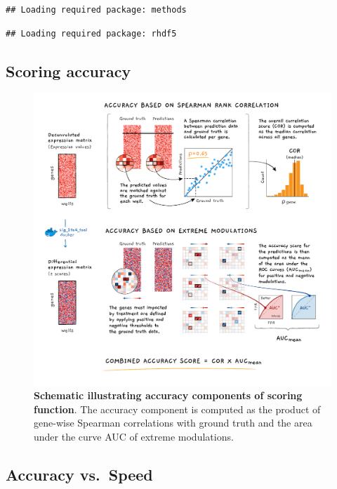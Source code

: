 \documentclass[]{article}
\begin{document}
\begin{verbatim}
## Loading required package: methods
\end{verbatim}

\begin{verbatim}
## Loading required package: rhdf5
\end{verbatim}

\hypertarget{scoring-accuracy}{%
\subsection{Scoring accuracy}\label{scoring-accuracy}}

\begin{figure}
\centering
\includegraphics{figures/deconvolution_contest Fig2_Final_revised.png}
\caption{\textbf{Schematic illustrating accuracy components of scoring
function}. The accuracy component is computed as the product of
gene-wise Spearman correlations with ground truth and the area under the
curve AUC of extreme modulations.}
\end{figure}

\hypertarget{accuracy-vs.-speed}{%
\subsection{Accuracy vs.~Speed}\label{accuracy-vs.-speed}}
\end{document}
